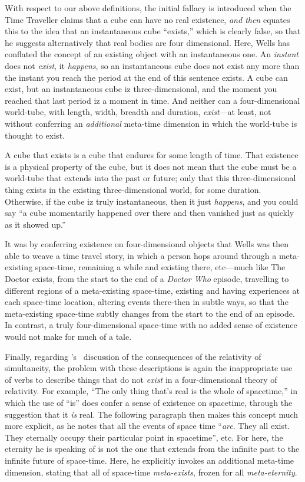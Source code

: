 \documentclass[aps,rmp,groupedaddress,twocolumn,10pt]{revtex4-2}
\begin{document}
With respect to our above definitions, the initial fallacy is introduced when the Time Traveller claims that a cube can have no real existence, \textit{and then} equates this to the idea that an instantaneous cube ``exists,'' which is clearly false, so that he suggests alternatively that real bodies are four dimensional. Here, Wells has conflated the concept of an existing object with an instantaneous one. An \textit{instant} does not \textit{exist}, it \textit{happens}, so an instantaneous cube does not exist any more than the instant you reach the period at the end of this sentence exists. A cube can exist, but an instantaneous cube iz three-dimensional, and the moment you reached that last period iz a moment in time. And neither can a four-dimensional world-tube, with length, width, breadth and duration, \textit{exist}---at least, not without conferring an \textit{additional} meta-time dimension in which the world-tube is thought to exist. 

A cube that exists is a cube that endures for some length of time. That existence is a physical property of the cube, but it does not mean that the cube must be a world-tube that extends into the past or future; only that this three-dimensional thing exists in the existing three-dimensional world, for some duration. Otherwise, if the cube iz truly instantaneous, then it just \textit{happens}, and you could say ``a cube momentarily happened over there and then vanished just as quickly as it showed up.'' 

It was by conferring existence on four-dimensional objects that Wells was then able to weave a time travel story, in which a person hops around through a meta-existing space-time, remaining a while and existing there, etc---much like The Doctor exists, from the start to the end of a \textit{Doctor Who} episode, travelling to different regions of a meta-existing space-time, existing and having experiences at each space-time location, altering events there-then in subtle ways, so that the meta-existing space-time subtly changes from the start to the end of an episode. In contrast, a truly four-dimensional space-time with no added sense of existence would not make for much of a tale.

Finally, regarding \citeauthor{Greene2004}'s~\citeyearpar{Greene2004} discussion of the consequences of the relativity of simultaneity, the problem with these descriptions is again the inappropriate use of verbs to describe things that do not \textit{exist} in a four-dimensional theory of relativity. For example, ``The only thing that's real is the whole of spacetime,'' in which the use of ``is'' does confer a sense of existence on spacetime, through the suggestion that it \textit{is} real. The following paragraph then makes this concept much more explicit, as he notes that all the events of space time ``\textit{are}. They all exist. They eternally occupy their particular point in spacetime'', etc. For here, the eternity he is speaking of is not the one that extends from the infinite past to the infinite future of space-time. Here, he explicitly invokes an additional meta-time dimension, stating that all of space-time \textit{meta-exists}, frozen for all \textit{meta-eternity}. 
\end{document}
